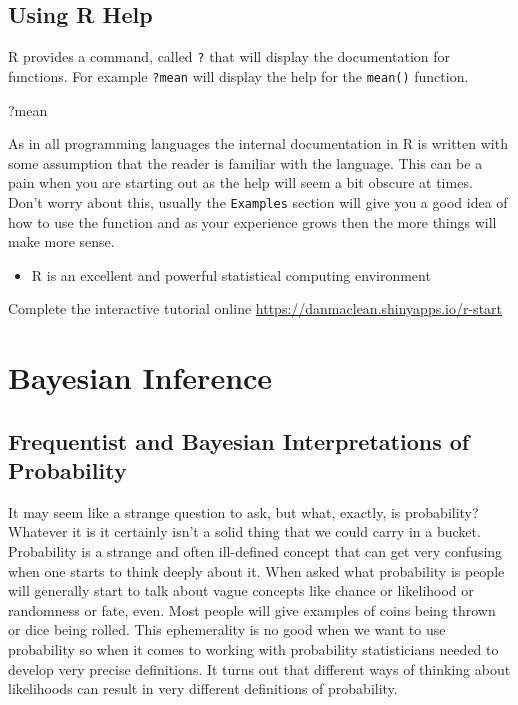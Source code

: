 \documentclass[
]{book}
\newenvironment{Shaded}{\begin{snugshade}}{\end{snugshade}}
\newcommand{\NormalTok}[1]{#1}
\providecommand{\tightlist}{%
  \setlength{\itemsep}{0pt}\setlength{\parskip}{0pt}}
\newenvironment{task}
{ \begin{tcolorbox}[title=For you to do,title filled] }
{  \end{tcolorbox} }
\newenvironment{roundup}
{ \begin{tcolorbox}[colbacktitle=yellow!50!white,
title=Round Up,coltitle=black,
fonttitle=\bfseries] }
{  \end{tcolorbox} }
\begin{document}
\hypertarget{using-r-help}{%
\section{Using R Help}\label{using-r-help}}

R provides a command, called \texttt{?} that will display the documentation for functions. For example \texttt{?mean} will display the help for the \texttt{mean()} function.

\begin{Shaded}
\begin{Highlighting}[]
\NormalTok{?mean}
\end{Highlighting}
\end{Shaded}

As in all programming languages the internal documentation in R is written with some assumption that the reader is familiar with the language. This can be a pain when you are starting out as the help will seem a bit obscure at times. Don't worry about this, usually the \texttt{Examples} section will give you a good idea of how to use the function and as your experience grows then the more things will make more sense.

\begin{roundup}
\begin{itemize}
\tightlist
\item
  R is an excellent and powerful statistical computing environment
\end{itemize}
\end{roundup}

\begin{task}
Complete the interactive tutorial online \url{https://danmaclean.shinyapps.io/r-start}
\end{task}

\hypertarget{bayesian-inference}{%
\chapter{Bayesian Inference}\label{bayesian-inference}}

\hypertarget{frequentist-and-bayesian-interpretations-of-probability}{%
\section{Frequentist and Bayesian Interpretations of Probability}\label{frequentist-and-bayesian-interpretations-of-probability}}

It may seem like a strange question to ask, but what, exactly, is probability? Whatever it is it certainly isn't a solid thing that we could carry in a bucket. Probability is a strange and often ill-defined concept that can get very confusing when one starts to think deeply about it. When asked what probability is people will generally start to talk about vague concepts like chance or likelihood or randomness or fate, even. Most people will give examples of coins being thrown or dice being rolled. This ephemerality is no good when we want to use probability so when it comes to working with probability statisticians needed to develop very precise definitions. It turns out that different ways of thinking about likelihoods can result in very different definitions of probability.
\end{document}
